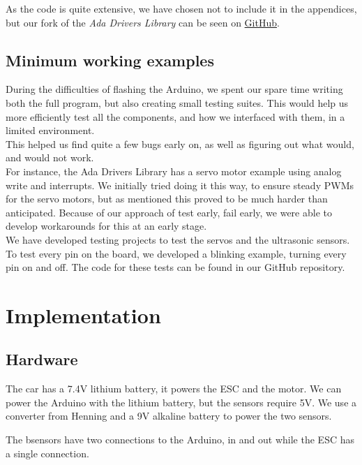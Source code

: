 \documentclass{article}
\begin{document}
As the code is quite extensive, we have chosen not to include it in the appendices, but our fork of the \textit{Ada Drivers Library} can be seen on \href{https://github.com/Stykk-Gruppen/Ada_Drivers_Library}{GitHub}.

\subsection{Minimum working examples}

During the difficulties of flashing the Arduino, we spent our spare time writing both the full program, but also creating small testing suites. This would help us more efficiently test all the components, and how we interfaced with them, in a limited environment.\\ 

This helped us find quite a few bugs early on, as well as figuring out what would, and would not work.\\

For instance, the Ada Drivers Library has a servo motor example using analog write and interrupts. We initially tried doing it this way, to ensure steady PWMs for the servo motors, but as mentioned this proved to be much harder than anticipated. Because of our approach of test early, fail early, we were able to develop workarounds for this at an early stage.\\ 

We have developed testing projects to test the servos and the ultrasonic sensors. To test every pin on the board, we developed a blinking example, turning every pin on and off. The code for these tests can be found in our GitHub repository.

\section{Implementation}

\subsection{Hardware}
The car has a 7.4V lithium battery, it powers the ESC and the motor. We can power the Arduino with the lithium battery, but the sensors require 5V. We use a converter from Henning and a 9V alkaline battery to power the two sensors.

The bsensors have two connections to the Arduino, in and out while the ESC has a single connection.
\end{document}
